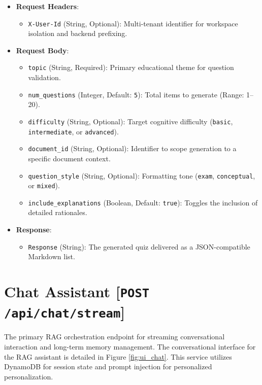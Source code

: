 \begin{itemize}
    \item \textbf{Request Headers}:
    \begin{itemize}
        \item \texttt{X-User-Id} (String, Optional): Multi-tenant identifier for workspace isolation and backend prefixing.
    \end{itemize}
    \item \textbf{Request Body}:
    \begin{itemize}
        \item \texttt{topic} (String, Required): Primary educational theme for question validation.
        \item \texttt{num\_questions} (Integer, Default: \texttt{5}): Total items to generate (Range: 1--20).
        \item \texttt{difficulty} (String, Optional): Target cognitive difficulty (\texttt{basic}, \texttt{intermediate}, or \texttt{advanced}).
        \item \texttt{document\_id} (String, Optional): Identifier to scope generation to a specific document context.
        \item \texttt{question\_style} (String, Optional): Formatting tone (\texttt{exam}, \texttt{conceptual}, or \texttt{mixed}).
        \item \texttt{include\_explanations} (Boolean, Default: \texttt{true}): Toggles the inclusion of detailed rationales.
    \end{itemize}
    \item \textbf{Response}:
    \begin{itemize}
        \item \texttt{Response} (String): The generated quiz delivered as a JSON-compatible Markdown list.
    \end{itemize}
\end{itemize}

\section*{Chat Assistant [\texttt{POST} \texttt{/api/chat/stream}]}
The primary RAG orchestration endpoint for streaming conversational interaction and long-term memory management. The conversational interface for the RAG assistant is detailed in Figure \ref{fig:ui_chat}. This service utilizes DynamoDB for session state and prompt injection for personalized personalization.

